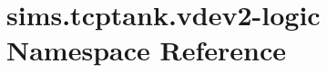 \section{sims.\+tcptank.\+vdev2-\/logic Namespace Reference}
\label{namespacesims_1_1tcptank_1_1vdev2-logic}
